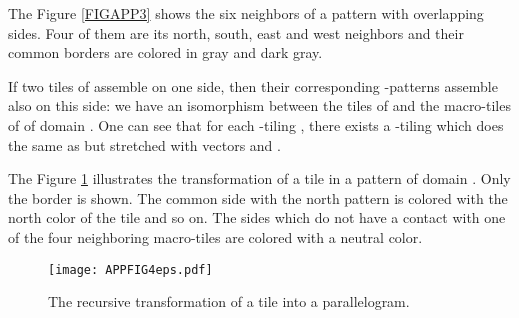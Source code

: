 \documentclass{llncs}
\begin{document}
The Figure \ref{FIGAPP3} shows the six neighbors of a pattern with overlapping sides. Four of them are its north,
south, east and west neighbors and their common borders are colored in gray and dark gray.

If two tiles of  assemble on one side, then their corresponding -patterns assemble also on this
side: we have an isomorphism between the tiles of  and the macro-tiles of  of domain .
One can see that for each -tiling , there exists a -tiling  which does the same as
 but stretched with vectors  and .

The Figure \ref{FIGAPP4} illustrates the transformation of a tile in a pattern of domain . Only the border is
shown. The common side with the north pattern is colored with the north color of the tile and so on. The sides which
do not have a contact with one of the four neighboring macro-tiles are colored with a neutral color.



\begin{figure}[t]
\begin{center}
\texttt{[image: APPFIG4eps.pdf]}
\caption{The recursive transformation of a tile into a parallelogram.}
\label{FIGAPP4}
\end{center}
\end{figure}
\end{document}
